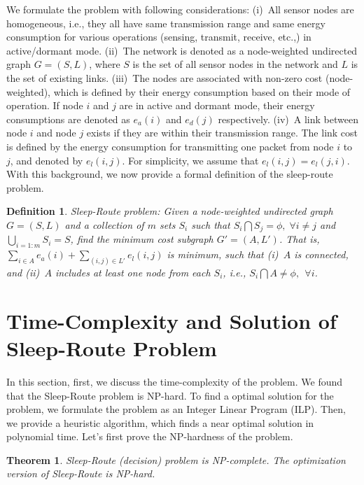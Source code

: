 \documentclass[conference]{IEEEtran}
\newtheorem{theorem}{Theorem}
\newtheorem{definition}[theo]{Definition}
\begin{document}
We formulate the problem with following considerations: (i)~All sensor nodes are homogeneous, i.e., they all have same transmission range and same energy consumption for various operations (sensing, transmit, receive, etc.,) in active/dormant mode.
(ii)~The network is denoted as a node-weighted undirected graph $G=(S,L)$, where $S$ is the set of all sensor nodes in the network and $L$ is the set of existing links. 
(iii)~The nodes are associated with non-zero cost (node-weighted), which is defined by their energy consumption based on their mode of operation. If node $i$ and $j$ are in active and dormant mode, their energy consumptions are denoted as $e_{a}(i)$ and $e_{d}(j)$ respectively.
(iv)~A link between node $i$ and node $j$ exists if they are within their transmission range. The link cost is defined by the energy consumption for transmitting one packet from node $i$ to $j$, and denoted by $e_{l}(i,j)$. For simplicity, we assume that $e_{l}(i,j) = e_{l}(j,i)$.
With this background, we now provide a formal definition of the sleep-route problem.


\begin{definition} Sleep-Route problem: Given a node-weighted undirected graph $G=(S,L)$ and a collection of $m$ sets $S_{i}$ such that $S_{i}\bigcap S_{j}=\phi,\;\forall i\neq j$ and $\bigcup_{i=1:m} S_{i}=S$, find the minimum cost subgraph $G'=(A,L')$. That is, $\sum_{i\in A} e_{a}(i) + \sum_{(i,j)\in L'} e_{l}(i,j)$ is minimum, such that (i)~$A$ is connected, and (ii)~$A$ includes at least one node from each $S_{i}$, i.e., $S_{i}\bigcap A \ne \phi,\ \ \forall i$.
\end{definition}

\section{Time-Complexity and Solution of Sleep-Route Problem}
\label{sec:sr}
In this section, first, we discuss the time-complexity of the problem. We found that the Sleep-Route problem is NP-hard. To find a optimal solution for the problem, we formulate the problem as an Integer Linear Program (ILP). Then, we provide a heuristic algorithm, which finds a near optimal solution in polynomial time. Let's first prove the NP-hardness of the problem.

\begin{theorem}\label{Thm1}
Sleep-Route (decision) problem is NP-complete. The optimization version of Sleep-Route is NP-hard. 
\end{theorem}
\end{document}

